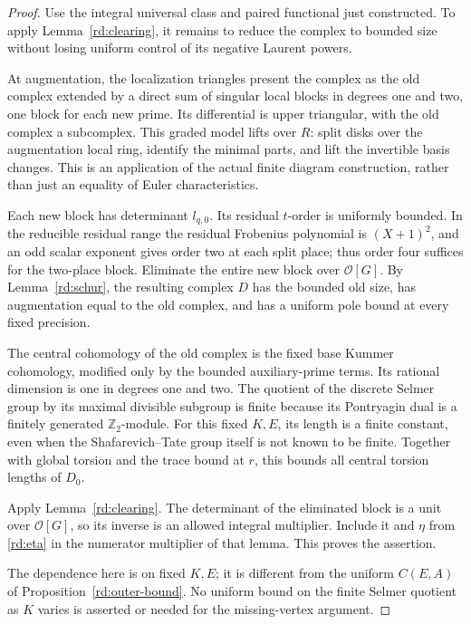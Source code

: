 \begin{proof}
Use the integral universal class and paired functional just
constructed.  To apply Lemma~\ref{rd:clearing}, it remains to
reduce the complex to bounded size without losing uniform control
of its negative Laurent powers.

At augmentation, the localization triangles
present the complex as the old complex extended
by a direct sum of singular local blocks in
degrees one and two, one block for each new
prime.  Its differential is upper triangular,
with the old complex a subcomplex.  This graded
model lifts over \(R\): split disks over the
augmentation local ring, identify the minimal
parts, and lift the invertible basis changes.
This is an application of the actual finite
diagram construction, rather than just an
equality of Euler characteristics.

Each new block has determinant \(l_{q,0}\).
Its residual \(t\)-order is uniformly bounded.
In the reducible residual range the residual
Frobenius polynomial is \((X+1)^2\), and an
odd scalar exponent gives order two at each
split place; thus order four suffices for the
two-place block.  Eliminate the entire new
block over \(\mathcal O[G]\).  By
Lemma~\ref{rd:schur}, the resulting complex
\(D\) has the bounded old size, has augmentation
equal to the old complex, and has a uniform
pole bound at every fixed precision.

The central cohomology of the old complex is
the fixed base Kummer cohomology, modified only
by the bounded auxiliary-prime terms.  Its
rational dimension is one in degrees one and
two.  The quotient of the discrete Selmer
group by its maximal divisible subgroup is
finite because its Pontryagin dual is a
finitely generated \(\mathbb Z_2\)-module.
For this fixed \(K,E\), its length is a finite
constant, even when the Shafarevich--Tate
group itself is not known to be finite.
Together with global torsion and the trace
bound at \(r\), this bounds all central
torsion lengths of \(D_0\).

Apply Lemma~\ref{rd:clearing}.  The determinant
of the eliminated block is a unit over
\(\mathcal O[G]\), so its inverse is an
allowed integral multiplier.  Include it
and \(\eta\) from \eqref{rd:eta} in the
numerator multiplier of that lemma.
This proves the assertion.

The dependence here is on fixed \(K,E\);
it is different from the uniform
\(C(E,A)\) of Proposition~\ref{rd:outer-bound}.
No uniform bound on the finite Selmer quotient
as \(K\) varies is asserted or needed for
the missing-vertex argument.
\end{proof}

